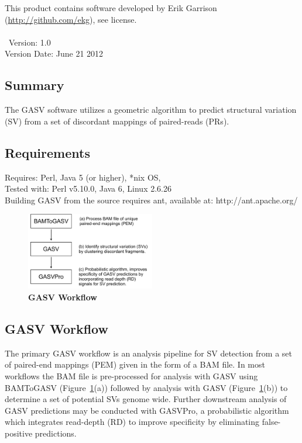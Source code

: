 \documentclass[11pt]{article}
\begin{document}
\noindent This product contains software developed by Erik Garrison (\url{http://github.com/ekg}), see license.\\ \\ 
\
\noindent Version: 1.0\\
\noindent Version Date: June 21 2012




\subsection{Summary}

The GASV software utilizes a geometric algorithm to predict structural variation (SV) from a set of discordant mappings of paired-reads (PRs). 

\subsection{Requirements}
Requires: Perl, Java 5 (or higher), *nix OS, \\
\noindent Tested with: Perl v5.10.0, Java 6, Linux 2.6.26 \\

\noindent Building GASV from the source requires ant, available at: 
http://ant.apache.org/ \clearpage

\begin{figure}
  \begin{center}
    \includegraphics[width=0.5\textwidth]{Figures/GASV_Workflow.pdf}
  \end{center}
  \caption{\textbf{GASV Workflow}}
  \label{fig:GASVWorkflow}
\end{figure}

\subsection{GASV Workflow}

The primary GASV workflow is an analysis pipeline for SV detection from a set of paired-end mappings (PEM) given in the form of a BAM file. In most workflows the BAM file is pre-processed for analysis with GASV using BAMToGASV (Figure~\ref{fig:GASVWorkflow}(a)) followed by analysis with GASV (Figure~\ref{fig:GASVWorkflow}(b)) to determine a set of potential SVs genome wide. Further downstream analysis of GASV predictions may be conducted with GASVPro, a probabilistic algorithm which integrates read-depth (RD) to improve specificity by eliminating false-positive predictions. 
\end{document}

